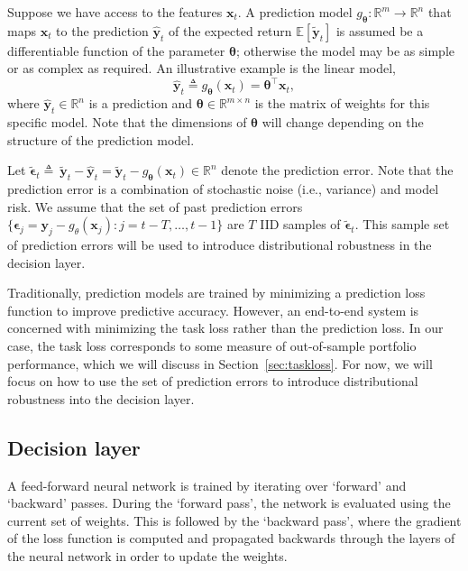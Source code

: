 \documentclass[10pt, twocolumn]{article}
\theoremstyle{plain}
\theoremstyle{definition}
\begin{document}
Suppose we have access to the features \(\bm{x}_t\). A prediction model 
\(g_{\bm{\theta}}: \mathbb{R}^m \rightarrow \mathbb{R}^n\) that maps \(\bm{x}_t\) 
to the prediction \(\hat{\bm{y}}_{t}\) of the expected return 
\(\mathbb{E}[\tilde{\bm{y}}_t]\) is assumed be a differentiable 
function of the parameter \(\bm{\theta}\); otherwise the model may be as simple or 
as complex as required. An illustrative example is the linear model,  
\[
	\hat{\bm{y}}_{t} \triangleq g_{\bm{\theta}}(\bm{x}_t) = \bm{\theta}^\top \bm{x}_t,
\]
where \(\hat{\bm{y}}_{t}\in\mathbb{R}^n\) is a prediction and
\(\bm{\theta}\in\mathbb{R}^{m\times n}\) is the matrix of weights for this
specific model. Note that the dimensions of \(\bm{\theta}\) will change
depending on the structure of the prediction model.   

Let \(\bm{\tilde{\epsilon}}_t \triangleq\ \bm{\tilde{y}}_t - \hat{\bm{y}}_t = 
\bm{\tilde{y}}_t - g_{\bm{\theta}}(\bm{x}_t) \in\mathbb{R}^n\) denote the prediction
error. Note that the prediction error is a combination of stochastic noise 
(i.e., variance) and model risk. We assume that the set of past prediction 
errors \(\{\bm{\epsilon}_j = \bm{y}_j - g_{\theta}(\bm{x}_j): j = t-T, \ldots, t-1\}\) 
are \(T\) IID samples of \(\tilde{\bm{\epsilon}}_{t}\). This sample set 
of prediction errors will be used to introduce distributional robustness in 
the decision layer.

Traditionally, prediction models are trained by minimizing a
prediction loss function to improve predictive accuracy. However, an
end-to-end system is concerned with minimizing the task loss rather than
the prediction loss. In our case, the task loss corresponds to some
measure of out-of-sample portfolio performance, which we will discuss in
Section~\ref{sec:taskloss}. For now, we will focus on how to use the set of
prediction errors to introduce distributional robustness into the decision
layer.  

\subsection{Decision layer}\label{sec:decision}

A feed-forward neural network is trained by iterating over `forward' and
`backward' passes. During the `forward pass', the network is evaluated
using the current set of weights. This is followed by the `backward pass',
where the gradient of the loss function is computed and propagated
backwards through the layers of the neural network in order to update the
weights.  
\end{document}
